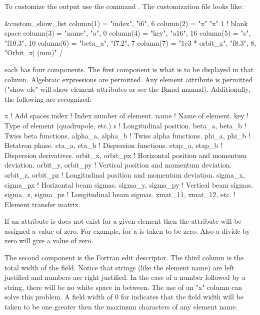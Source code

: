 {\begin{description}
To customize the output use the command . The customization file looks like:
\begin{example}
  &custom_show_list
    column(1) = "index",   "i6",     6 
    column(2) = "x"        "x"       1       ! blank space
    column(3) = "name",    "a",      0
    column(4) = "key",     "a16",   16
    column(5) = "s",       "f10.3", 10
    column(6) = "beta_a",  "f7.2",   7
    column(7) = "1e3 * orbit_x", "f8.3", 8, "Orbit_x| (mm)" 
  /
\end{example}
each  has four components. The first component is what
is to be displayed in that column. Algebraic expressions are
permitted. Any element attribute is permitted ("show ele" will show
element attributes or see the Bmad manual). Additionally, the following
are recognized:
\begin{example}
  x                           ! Add spaces
  index                       ! Index number of element.
  name                        ! Name of element.
  key                         ! Type of element (quadrupole, etc.)
  s                           ! Longitudinal position.
  beta_a,  beta_b             ! Twiss beta functions.
  alpha_a, alpha_b            ! Twiss alpha functions.
  phi_a,   phi_b              ! Betatron phase.
  eta_a,   eta_b              ! Dispersion functions.
  etap_a,  etap_b             ! Dispersion derivatives.
  orbit_x, orbit_px           ! Horizontal position and momentum deviation.
  orbit_y, orbit_py           ! Vertical position and momentum deviation.
  orbit_z, orbit_pz           ! Longitudinal position and momentum deviation.
  sigma_x, sigma_px           ! Horizontal beam sigmas.
  sigma_y, sigma_py           ! Vertical beam sigmas.
  sigma_z, sigma_pz           ! Longitudinal beam sigmas.
  xmat_11, xmat_12, etc.      ! Element transfer matrix.
\end{example}
If an attribute is does not exist for a given element then the
attribute will be assigned a value of zero. For example, 
for a  is taken to be zero. Also a divide by zero will
give a value of zero.

The second component is the Fortran edit descriptor. The third column
is the total width of the field. Notice that strings (like the element
name) are left justified and numbers are right justified. In the case
of a number followed by a string, there will be no white space in
between. The use of an "x" column can solve this problem. A field width
of 0 for  indicates that the field width will be taken to be
one greater then the maximum characters of any element name.


\end{description}}
